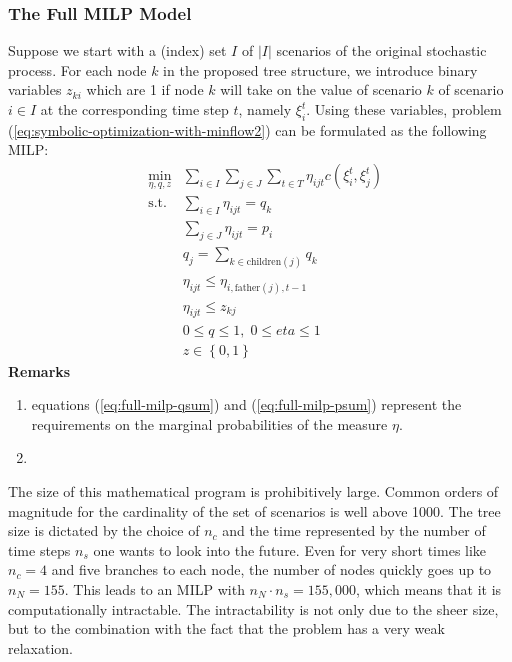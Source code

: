 \documentclass[a4paper, 12pt] {article}
\begin{document}
\subsubsection{The Full MILP Model}
Suppose we start with a (index) set $I$ of $\left|I\right|$ scenarios of the original stochastic process. For each node $k$ in the proposed tree structure, we introduce binary variables $z_{ki}$ which are 1 if node $k$ will take on the value of scenario $k$ of scenario $i \in I$ at the corresponding time step $t$, namely $\xi_i^t$. Using these variables, problem (\ref{eq:symbolic-optimization-with-minflow2}) can be formulated as the following MILP:
\begin{eqnarray}
  \label{eq:full-milp-objective}
  &\min_{\eta, q, z}&\sum_{i\in I}\sum_{j\in J}\sum_{t\in T}\eta_{ijt}c(\xi_i^t,\xi_j^t)\\
  \label{eq:full-milp-qsum}
  &\mathrm{s.t.}&\sum_{i\in I}\eta_{ijt} = q_k\\
  \label{eq:full-milp-psum}
  &&\sum_{j\in J}\eta_{ijt} = p_i\\
  \label{eq:full-milp-q-distribution}
  &&q_j = \sum_{k\in \mathrm{children}(j)}q_k\\
  \label{eq:full-milp-tree}
  &&\eta_{ijt} \leq \eta_{i,\mathrm{father}(j),t-1}\\
  \label{eq:full-milp-only-selected}
  &&\eta_{ijt} \leq z_{kj} \\%
  \label{eq:full-milp-contibounds}
  &&0\leq q \leq 1,\;0\leq eta \leq 1\\
  \label{eq:full-milp-binarybounds}
  &&z\in \left\{0,1\right\}
\end{eqnarray}
\textbf{Remarks}
\begin{enumerate}
\item equations (\ref{eq:full-milp-qsum}) and (\ref{eq:full-milp-psum}) represent the requirements on the marginal probabilities of the measure $\eta$.
\item 
\end{enumerate}
The size of this mathematical program is prohibitively large. Common orders of magnitude for the cardinality of the set of scenarios is well above 1000. The tree size is dictated by the choice of $n_c$ and the time represented by the number of time steps $n_s$ one wants to look into the future. Even for very short times like $n_c=4$ and five branches to each node, the number of nodes quickly goes up to $n_N=155$. This leads to an MILP with $n_N\cdot n_s=155,000$, which means that it is computationally intractable. The intractability is not only due to the sheer size, but to the combination with the fact that the problem has a very weak relaxation.
\end{document}
